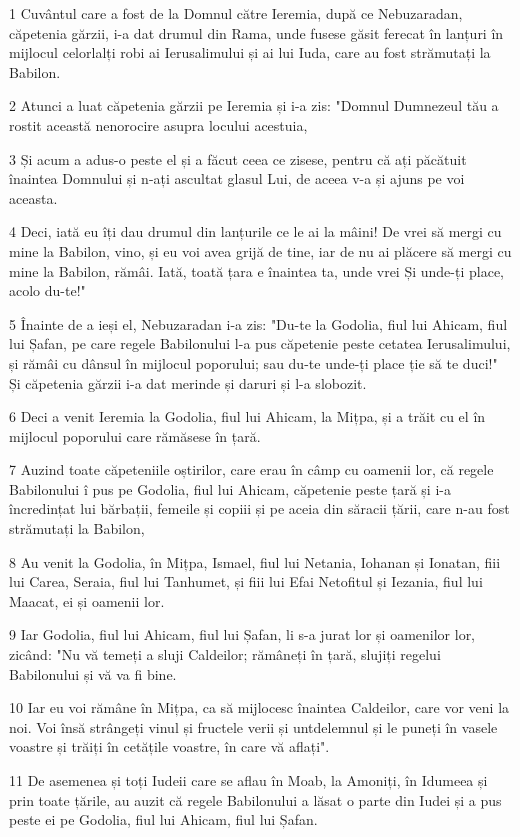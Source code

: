 \par 1 Cuvântul care a fost de la Domnul către Ieremia, după ce Nebuzaradan, căpetenia gărzii, i-a dat drumul din Rama, unde fusese găsit ferecat în lanțuri în mijlocul celorlalți robi ai Ierusalimului și ai lui Iuda, care au fost strămutați la Babilon.
\par 2 Atunci a luat căpetenia gărzii pe Ieremia și i-a zis: "Domnul Dumnezeul tău a rostit această nenorocire asupra locului acestuia,
\par 3 Și acum a adus-o peste el și a făcut ceea ce zisese, pentru că ați păcătuit înaintea Domnului și n-ați ascultat glasul Lui, de aceea v-a și ajuns pe voi aceasta.
\par 4 Deci, iată eu îți dau drumul din lanțurile ce le ai la mâini! De vrei să mergi cu mine la Babilon, vino, și eu voi avea grijă de tine, iar de nu ai plăcere să mergi cu mine la Babilon, rămâi. Iată, toată țara e înaintea ta, unde vrei Și unde-ți place, acolo du-te!"
\par 5 Înainte de a ieși el, Nebuzaradan i-a zis: "Du-te la Godolia, fiul lui Ahicam, fiul lui Șafan, pe care regele Babilonului l-a pus căpetenie peste cetatea Ierusalimului, și rămâi cu dânsul în mijlocul poporului; sau du-te unde-ți place ție să te duci!" Și căpetenia gărzii i-a dat merinde și daruri și l-a slobozit.
\par 6 Deci a venit Ieremia la Godolia, fiul lui Ahicam, la Mițpa, și a trăit cu el în mijlocul poporului care rămăsese în țară.
\par 7 Auzind toate căpeteniile oștirilor, care erau în câmp cu oamenii lor, că regele Babilonului î pus pe Godolia, fiul lui Ahicam, căpetenie peste țară și i-a încredințat lui bărbații, femeile și copiii și pe aceia din săracii țării, care n-au fost strămutați la Babilon,
\par 8 Au venit la Godolia, în Mițpa, Ismael, fiul lui Netania, Iohanan și Ionatan, fiii lui Carea, Seraia, fiul lui Tanhumet, și fiii lui Efai Netofitul și Iezania, fiul lui Maacat, ei și oamenii lor.
\par 9 Iar Godolia, fiul lui Ahicam, fiul lui Șafan, li s-a jurat lor și oamenilor lor, zicând: "Nu vă temeți a sluji Caldeilor; rămâneți în țară, slujiți regelui Babilonului și vă va fi bine.
\par 10 Iar eu voi rămâne în Mițpa, ca să mijlocesc înaintea Caldeilor, care vor veni la noi. Voi însă strângeți vinul și fructele verii și untdelemnul și le puneți în vasele voastre și trăiți în cetățile voastre, în care vă aflați".
\par 11 De asemenea și toți Iudeii care se aflau în Moab, la Amoniți, în Idumeea și prin toate țările, au auzit că regele Babilonului a lăsat o parte din Iudei și a pus peste ei pe Godolia, fiul lui Ahicam, fiul lui Șafan.
